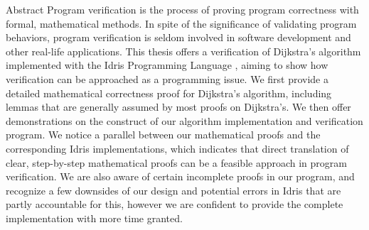 \begin{poliabstract}{Abstract} 
Program verification is the process of proving program correctness with formal, mathematical methods. In spite of the significance of validating program behaviors, program verification is seldom involved in software development and other real-life applications. This thesis offers a verification of Dijkstra's algorithm \cite{Dijkstras} implemented with the Idris Programming Language \cite{idris}, aiming to show how verification can be approached as a programming issue. We first provide a detailed mathematical correctness proof for Dijkstra's algorithm, including lemmas that are generally assumed by most proofs on Dijkstra's. We then offer demonstrations on the construct of our algorithm implementation and verification program. We notice a parallel between our mathematical proofs and the corresponding Idris implementations, which indicates that direct translation of clear, step-by-step mathematical proofs can be a feasible approach in program verification. We are also aware of certain incomplete proofs in our program, and recognize a few downsides of our design and potential errors in Idris that are partly accountable for this, however we are confident to provide the complete implementation with more time granted. 


\end{poliabstract}